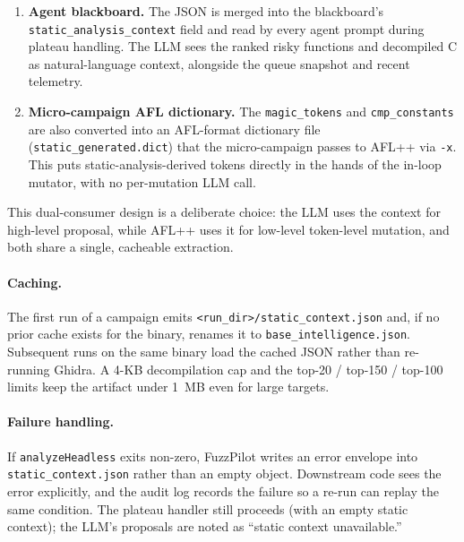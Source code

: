 \documentclass[11pt]{article}
\begin{document}
\begin{enumerate}
  \item \textbf{Agent blackboard.} The JSON is merged into the
  blackboard's \texttt{static\_analysis\_context} field and read
  by every agent prompt during plateau handling. The LLM sees the
  ranked risky functions and decompiled C as natural-language
  context, alongside the queue snapshot and recent telemetry.
  \item \textbf{Micro-campaign AFL dictionary.} The
  \texttt{magic\_tokens} and \texttt{cmp\_constants} are also
  converted into an AFL-format dictionary file
  (\texttt{static\_generated.dict}) that the micro-campaign passes
  to AFL++ via \texttt{-x}. This puts static-analysis-derived
  tokens directly in the hands of the in-loop mutator, with no
  per-mutation LLM call.
\end{enumerate}

This dual-consumer design is a deliberate choice: the LLM uses the
context for high-level proposal, while AFL++ uses it for low-level
token-level mutation, and both share a single, cacheable extraction.

\paragraph{Caching.}
The first run of a campaign emits
\texttt{<run\_dir>/static\_context.json} and, if no prior cache
exists for the binary, renames it to
\texttt{base\_intelligence.json}. Subsequent runs on the same
binary load the cached JSON rather than re-running Ghidra. A
4-KB decompilation cap and the top-20 / top-150 / top-100 limits
keep the artifact under 1~MB even for large targets.

\paragraph{Failure handling.}
If \texttt{analyzeHeadless} exits non-zero, FuzzPilot writes an
error envelope into \texttt{static\_context.json} rather than an
empty object. Downstream code sees the error explicitly, and the
audit log records the failure so a re-run can replay the same
condition. The plateau handler still proceeds (with an empty
static context); the LLM's proposals are noted as ``static
context unavailable.''
\end{document}
